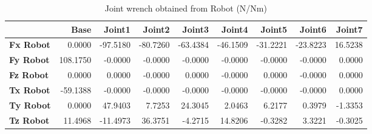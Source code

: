 \begin{table}[h!]
	\centering
	\caption{Joint wrench obtained from Robot (N/Nm)}
	\label{wrech_Robot_Pose12}
	\begin{tabular}{|l|r|r|r|r|r|r|r|r|}
		\hline
		\textbf{} & \textbf{Base} & \textbf{Joint1}  & \textbf{Joint2}  & \textbf{Joint3}  & \textbf{Joint4}  & \textbf{Joint5}  & \textbf{Joint6}  & \textbf{Joint7} \\ \hline
		\textbf{Fx Robot}  & 0.0000        & -97.5180        & -80.7260        & -63.4384        & -46.1509        & -31.2221        & -23.8223        & 16.5238 \\ \hline
		\textbf{Fy Robot}  & 108.1750        & -0.0000        & -0.0000        & -0.0000        & -0.0000        & -0.0000        & -0.0000        & 0.0000 \\ \hline
		\textbf{Fz Robot}  & 0.0000        & 0.0000        & -0.0000        & 0.0000        & -0.0000        & 0.0000        & -0.0000        & 0.0000 \\ \hline
		\textbf{Tx Robot}  & -59.1388        & -0.0000        & -0.0000        & -0.0000        & -0.0000        & -0.0000        & -0.0000        & 0.0000 \\ \hline
		\textbf{Ty Robot}  & 0.0000        & 47.9403        & 7.7253        & 24.3045        & 2.0463        & 6.2177        & 0.3979        & -1.3353 \\ \hline
		\textbf{Tz Robot}  & 11.4968        & -11.4973        & 36.3751        & -4.2715        & 14.8206        & -0.3282        & 3.3221        & -0.3025 \\ \hline
	\end{tabular}
\end{table}

